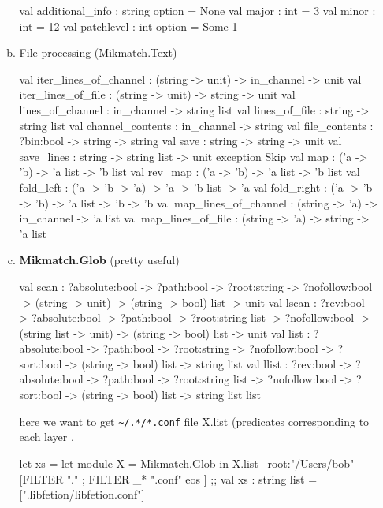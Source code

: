 \begin{enumerate}
\begin{enumerate}[(a)]
\begin{bluecode}      
val additional_info : string option = None
val major : int = 3
val minor : int = 12
val patchlevel : int option = Some 1    
\end{bluecode}


\item File processing (Mikmatch.Text)

  \begin{bluecode}
    val iter_lines_of_channel : (string -> unit) -> in_channel -> unit
    val iter_lines_of_file : (string -> unit) -> string -> unit
    val lines_of_channel : in_channel -> string list
    val lines_of_file : string -> string list
    val channel_contents : in_channel -> string
    val file_contents : ?bin:bool -> string -> string
    val save : string -> string -> unit
    val save_lines : string -> string list -> unit
    exception Skip
    val map : ('a -> 'b) -> 'a list -> 'b list
    val rev_map : ('a -> 'b) -> 'a list -> 'b list
    val fold_left : ('a -> 'b -> 'a) -> 'a -> 'b list -> 'a
    val fold_right : ('a -> 'b -> 'b) -> 'a list -> 'b -> 'b
    val map_lines_of_channel : (string -> 'a) -> in_channel -> 'a list
    val map_lines_of_file : (string -> 'a) -> string -> 'a list
\end{bluecode}
\item \textbf{Mikmatch.Glob} (pretty useful)

  \begin{bluecode}
    val scan :
      ?absolute:bool ->
      ?path:bool ->
      ?root:string ->
      ?nofollow:bool -> (string -> unit) -> (string -> bool) list -> unit
    val lscan :
      ?rev:bool ->
      ?absolute:bool ->
      ?path:bool ->
      ?root:string list ->
      ?nofollow:bool ->
      (string list -> unit) -> (string -> bool) list -> unit
    val list :
      ?absolute:bool ->
      ?path:bool ->
      ?root:string ->
      ?nofollow:bool -> ?sort:bool -> (string -> bool) list -> string list
    val llist :
      ?rev:bool ->
      ?absolute:bool ->
      ?path:bool ->
      ?root:string list ->
      ?nofollow:bool ->
      ?sort:bool -> (string -> bool) list -> string list list
    \end{bluecode}

    here we want to get  \verb|~/.*/*.conf| file
    X.list (predicates corresponding to each layer .
    \begin{alternate}
let xs = let module X = Mikmatch.Glob in X.list ~root:"/Users/bob" [FILTER "." ; FILTER _* ".conf" eos ] ;;
val xs : string list = [".libfetion/libfetion.conf"]
\end{alternate}


\end{enumerate}
\end{enumerate}
